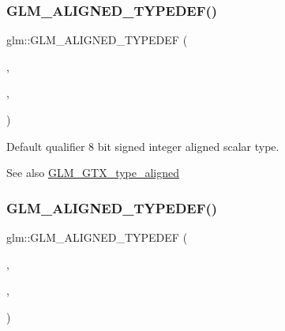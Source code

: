 \subsubsection{\texorpdfstring{G\+L\+M\+\_\+\+A\+L\+I\+G\+N\+E\+D\+\_\+\+T\+Y\+P\+E\+D\+E\+F()}{GLM\_ALIGNED\_TYPEDEF()}\hspace{0.1cm}{\footnotesize\ttfamily [37/209]}}
{\footnotesize\ttfamily glm\+::\+G\+L\+M\+\_\+\+A\+L\+I\+G\+N\+E\+D\+\_\+\+T\+Y\+P\+E\+D\+EF (\begin{DoxyParamCaption}\item[{\hyperlink{group__gtc__type__precision_ga96254f9c1c4506fc8eb5cf3301ce8565}{int8}}]{,  }\item[{aligned\+\_\+int8}]{,  }\item[{1}]{ }\end{DoxyParamCaption})}

Default qualifier 8 bit signed integer aligned scalar type. \begin{DoxySeeAlso}{See also}
\hyperlink{group__gtx__type__aligned}{G\+L\+M\+\_\+\+G\+T\+X\+\_\+type\+\_\+aligned} 
\end{DoxySeeAlso}
\mbox{\label{group__gtx__type__aligned_ga285649744560be21000cfd81bbb5d507}} 
\subsubsection{\texorpdfstring{G\+L\+M\+\_\+\+A\+L\+I\+G\+N\+E\+D\+\_\+\+T\+Y\+P\+E\+D\+E\+F()}{GLM\_ALIGNED\_TYPEDEF()}\hspace{0.1cm}{\footnotesize\ttfamily [38/209]}}
{\footnotesize\ttfamily glm\+::\+G\+L\+M\+\_\+\+A\+L\+I\+G\+N\+E\+D\+\_\+\+T\+Y\+P\+E\+D\+EF (\begin{DoxyParamCaption}\item[{\hyperlink{group__gtc__type__precision_ga2945a61d12771f8954994fcddf02b021}{int16}}]{,  }\item[{aligned\+\_\+int16}]{,  }\item[{2}]{ }\end{DoxyParamCaption})}


